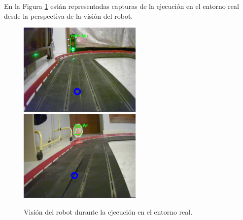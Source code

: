 En la Figura \ref{fig:screenshotsreal} están representadas capturas de la ejecución en el entorno real desde la perspectiva de la visión del robot.\\

\begin{figure} [h!]
	\begin{center}
		\includegraphics[width=6cm]{figs/screenshottrafficlight}\hspace{0.5cm}\includegraphics[width=6cm]{figs/screenshotstopsign}
	\end{center}
	\caption{Visión del robot durante la ejecución en el entorno real.}
	\label{fig:screenshotsreal}
\end{figure}\

